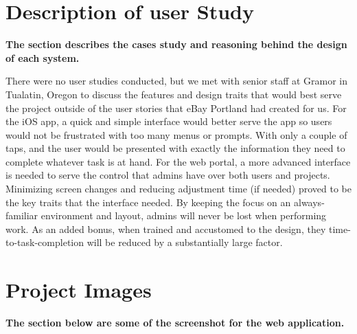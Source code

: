 \documentclass[onecolumn, draftclsnofoot,10pt, compsoc]{IEEEtran}
\newcommand\tab[1][0.5cm]{\hspace*{#1}}
\begin{document}
\section{Description of user Study}
\textbf{The section describes the cases study and reasoning behind the design of each system. } \newline

There were no user studies conducted, but we met with senior staff at Gramor in Tualatin, Oregon to discuss the features and design traits that would best serve the project outside of the user stories that eBay Portland had created for us.
\newline \newline
\tab For the iOS app, a quick and simple interface would better serve the app so users would not be frustrated with too many menus or prompts. With only a couple of taps, and the user would be presented with exactly the information they need to complete whatever task is at hand. 
\newline \newline
\tab For the web portal, a more advanced interface is needed to serve the control that admins have over both users and projects. Minimizing screen changes and reducing adjustment time (if needed) proved to be the key traits that the interface needed. By keeping the focus on an always-familiar environment and layout, admins will never be lost when performing work. As an added bonus, when trained and accustomed to the design, they time-to-task-completion will be reduced by a substantially large factor.
\newline

\newpage

\section{Project Images}
\textbf{The section below are some of the screenshot for the web application. } \newline
\end{document}
